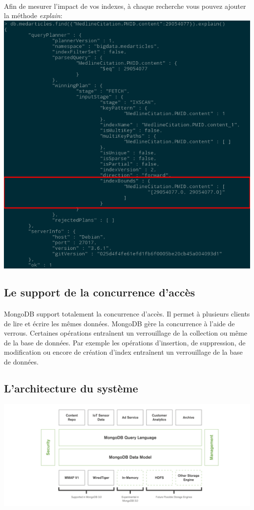 \documentclass{article}
\begin{document}
  \paragraph{} Afin de mesurer l'impact de vos indexes, à chaque recherche vous pouvez
  ajouter la méthode \emph{explain}:\\
  \includegraphics[scale=0.8]{mongodb/find_explain2.png}\\
\subsection{Le support de la concurrence d’accès}
  \paragraph{} MongoDB support totalement la concurrence d'accès.
  Il permet à plusieurs clients de lire et écrire les mêmes données.
  MongoDB gère la concurrence à l'aide de verrous. Certaines opérations entraînent
  un verrouillage de la collection ou même de la base de données. Par exemple
  les opérations d'insertion, de suppression, de modification ou encore de
  création d'index entraînent un verrouillage de la base de données.
\subsection{L’architecture du système}
  \includegraphics[scale=0.215]{mongodb/mongodb-arch-diag.png}\\
\end{document}
